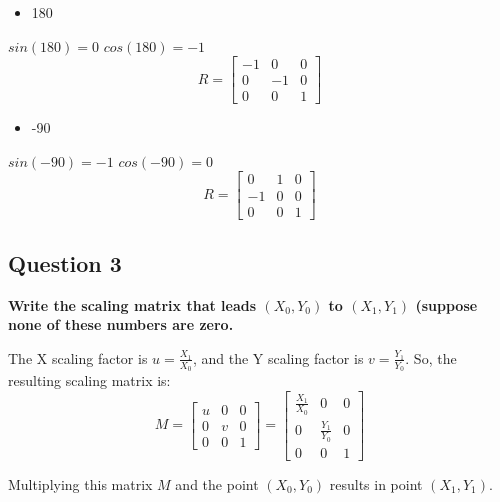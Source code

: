\documentclass[12pt]{article}
\begin{document}
\begin{itemize}
    \item 180\degree
\end{itemize}
$sin(180) = 0$ \hspace{1cm} $cos(180) = -1$
\begin{equation*}
    R=
    \begin{bmatrix}
    -1 & 0 & 0 \\
    0 & -1 & 0 \\
    0 & 0 & 1
    \end{bmatrix}
\end{equation*}

\begin{itemize}
    \item -90\degree
\end{itemize}
$sin(-90) = -1$ \hspace{1cm} $cos(-90) = 0$
\begin{equation*}
    R=
    \begin{bmatrix}
    0 & 1 & 0 \\
    -1 & 0 & 0 \\
    0 & 0 & 1
    \end{bmatrix}
\end{equation*}

\subsection*{Question 3}
{\bfseries Write the scaling matrix that leads $(X_0, Y_0)$ to $(X_1, Y_1)$ (suppose none of these numbers are zero.}

The X scaling factor is $u=\frac{X_1}{X_0}$, and the Y scaling factor is $v=\frac{Y_1}{Y_0}$. So, the resulting scaling matrix is:
\begin{equation*}
    M = 
    \begin{bmatrix}
    u & 0 & 0 \\
    0 & v & 0 \\
    0 & 0 & 1
    \end{bmatrix}
    = 
    \begin{bmatrix}
    \frac{X_1}{X_0} & 0 & 0 \\
    0 & \frac{Y_1}{Y_0} & 0 \\
    0 & 0 & 1
    \end{bmatrix}
\end{equation*}

Multiplying this matrix $M$ and the point $(X_0, Y_0)$ results in point $(X_1, Y_1)$.
\end{document}
